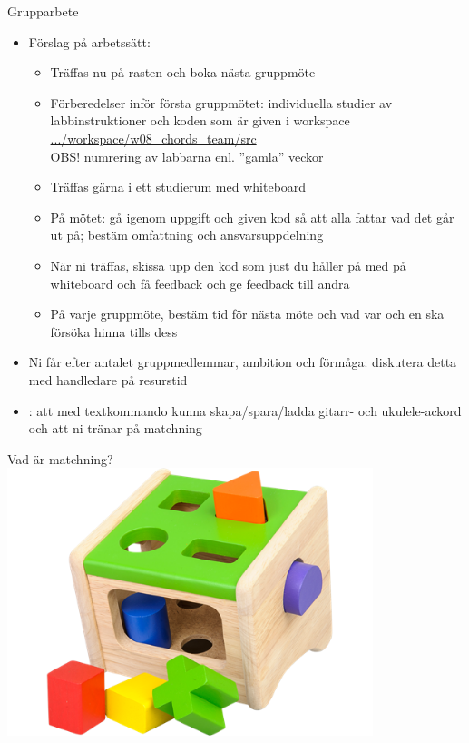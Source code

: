 \begin{Slide}{Grupparbete}\SlideFontSmall
\begin{itemize}
\item Förslag på arbetssätt:
\begin{itemize}\SlideFontSmall
\item Träffas nu på rasten och boka nästa gruppmöte
\item Förberedelser inför första gruppmötet: individuella studier av labbinstruktioner och koden som är given i workspace \\
\href{https://github.com/lunduniversity/introprog/tree/master/workspace/w08_chords_team/src}{.../workspace/w08\_chords\_team/src} \\
OBS! numrering av labbarna enl. ''gamla'' veckor
\item Träffas gärna i ett studierum med whiteboard
\item På mötet: gå igenom uppgift och given kod så att alla fattar vad det går ut på; bestäm omfattning och ansvarsuppdelning
\item När ni träffas, skissa upp den kod som just du håller på med på whiteboard och få feedback och ge feedback till andra
\item På varje gruppmöte, bestäm tid för nästa möte och vad var och en ska försöka hinna tills dess
\end{itemize}


\item Ni får  efter antalet gruppmedlemmar, ambition och förmåga: diskutera detta med handledare på resurstid

\item {}: att med textkommando kunna skapa/spara/ladda gitarr- och ukulele-ackord och att ni tränar på matchning

\end{itemize}
\end{Slide}



\begin{Slide}{Vad är matchning?}
\includegraphics[width=0.8\textwidth]{../img/plocklada.png}
\end{Slide}


